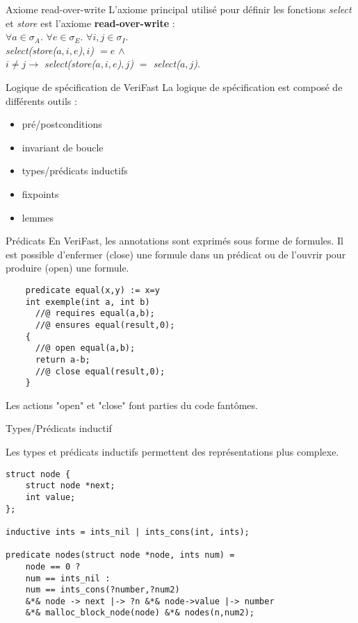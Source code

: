 \documentclass[9pt]{beamer}
\newcommand{\verifast}{VeriFast}
\begin{document}
\begin{frame}{Axiome read-over-write}
	L'axiome principal utilis\'e pour d\'efinir les fonctions \textit{select} et \textit{store} est l'axiome \textbf{read-over-write} :\\
	$\forall a\in \sigma_A.$ $\forall e\in \sigma_E.$ $\forall i,j\in \sigma_I.$\\ 
	\textit{select(store($a,i,e$)$,i$) $ = e$ $\land$ \\
			  $i\neq j \rightarrow$ select(store($a,i,e$)$,j$) $=$ select($a,j$)}.	
\end{frame}

\begin{frame}{Logique de sp\'ecification de \verifast}
	La logique de sp\'ecification est compos\'e de diff\'erents outils :
	\begin{itemize}
		\item pr\'e/postconditions
		\item invariant de boucle
		\item types/pr\'edicats inductifs
		\item fixpoints
		\item lemmes
	\end{itemize}
\end{frame}

\begin{frame}[fragile]{Pr\'edicats}
En \verifast, les annotations sont exprim\'es sous forme de formules. Il est possible d'enfermer (close) une formule dans un pr\'edicat ou de l'ouvrir pour produire (open) une formule.
	\begin{lstlisting}
	predicate equal(x,y) := x=y
	int exemple(int a, int b)
	  //@ requires equal(a,b);
	  //@ ensures equal(result,0);
	{
	  //@ open equal(a,b);
	  return a-b;
	  //@ close equal(result,0);
	}
	\end{lstlisting}
	
	Les actions "open" et "close" font parties du code fant\^omes.
\end{frame}

\begin{frame}[fragile]{Types/Pr\'edicats inductif}

Les types et pr\'edicats inductifs permettent des repr\'esentations plus complexe.
	\begin{lstlisting}
struct node {
	struct node *next;
	int value;
};
				
inductive ints = ints_nil | ints_cons(int, ints);

predicate nodes(struct node *node, ints num) =
	node == 0 ?
	num == ints_nil :
	num == ints_cons(?number,?num2) 
	&*& node -> next |-> ?n &*& node->value |-> number
	&*& malloc_block_node(node) &*& nodes(n,num2);
	\end{lstlisting}
\end{frame}
\end{document}
